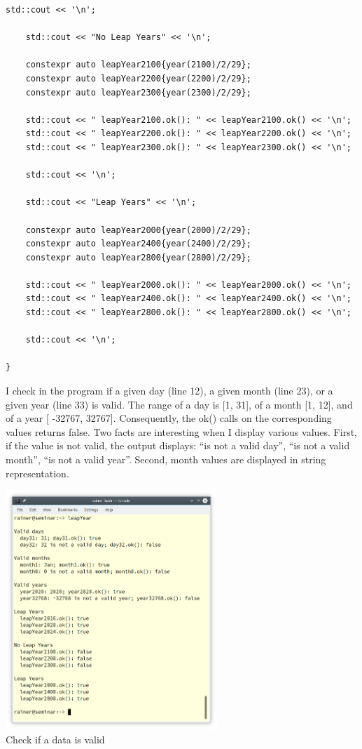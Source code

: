 \begin{lstlisting}[style=styleCXX]
	std::cout << '\n';
	
	std::cout << "No Leap Years" << '\n';
	
	constexpr auto leapYear2100{year(2100)/2/29};
	constexpr auto leapYear2200{year(2200)/2/29};
	constexpr auto leapYear2300{year(2300)/2/29};
	
	std::cout << " leapYear2100.ok(): " << leapYear2100.ok() << '\n';
	std::cout << " leapYear2200.ok(): " << leapYear2200.ok() << '\n';
	std::cout << " leapYear2300.ok(): " << leapYear2300.ok() << '\n';
	
	std::cout << '\n';
	
	std::cout << "Leap Years" << '\n';
	
	constexpr auto leapYear2000{year(2000)/2/29};
	constexpr auto leapYear2400{year(2400)/2/29};
	constexpr auto leapYear2800{year(2800)/2/29};
	
	std::cout << " leapYear2000.ok(): " << leapYear2000.ok() << '\n';
	std::cout << " leapYear2400.ok(): " << leapYear2400.ok() << '\n';
	std::cout << " leapYear2800.ok(): " << leapYear2800.ok() << '\n';
	
	std::cout << '\n';

}
\end{lstlisting}

I check in the program if a given day (line 12), a given month (line 23), or a given year (line 33) is valid. The range of a day is [1, 31], of a month [1, 12], and of a year [ -32767, 32767]. Consequently, the ok() calls on the corresponding values returns false. Two facts are interesting when I display various values. First, if the value is not valid, the output displays: “is not a valid day”, “is not a valid month”, “is not a valid year”. Second, month values are displayed in string representation.

\begin{center}
\includegraphics[width=0.6\textwidth]{content/3/chapter5/images/23.png}\\
Check if a data is valid
\end{center}

